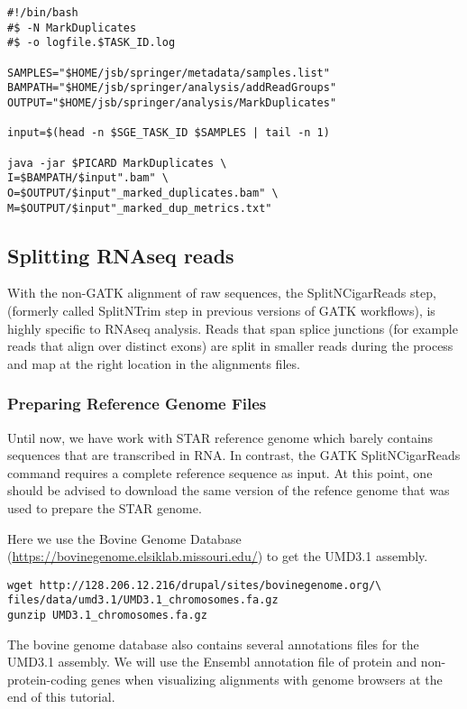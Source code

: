 \begin{verbatim}
#!/bin/bash
#$ -N MarkDuplicates
#$ -o logfile.$TASK_ID.log

SAMPLES="$HOME/jsb/springer/metadata/samples.list"
BAMPATH="$HOME/jsb/springer/analysis/addReadGroups"
OUTPUT="$HOME/jsb/springer/analysis/MarkDuplicates"

input=$(head -n $SGE_TASK_ID $SAMPLES | tail -n 1)

java -jar $PICARD MarkDuplicates \
I=$BAMPATH/$input".bam" \
O=$OUTPUT/$input"_marked_duplicates.bam" \
M=$OUTPUT/$input"_marked_dup_metrics.txt"
\end{verbatim}

\subsection{Splitting RNAseq reads}

With the non-GATK alignment of raw sequences, the SplitNCigarReads step, (formerly called SplitNTrim step in previous versions of GATK workflows), is highly specific to RNAseq analysis. Reads that span splice junctions (for example reads that align over distinct exons) are split in smaller reads during the process and map at the right location in the alignments files.

\subsubsection{Preparing Reference Genome Files}

Until now, we have work with STAR reference genome which barely contains sequences that are transcribed in RNA. In contrast, the GATK SplitNCigarReads command requires a complete reference sequence as input. At this point, one should be advised to download the same version of the refence genome that was used to prepare the STAR genome.

Here we use the Bovine Genome Database (\href{https://bovinegenome.elsiklab.missouri.edu/}{https://bovinegenome.elsiklab.missouri.edu/}) to get the UMD3.1 assembly.

\begin{verbatim}
wget http://128.206.12.216/drupal/sites/bovinegenome.org/\
files/data/umd3.1/UMD3.1_chromosomes.fa.gz
gunzip UMD3.1_chromosomes.fa.gz
\end{verbatim}


The bovine genome database also contains several annotations files for the UMD3.1 assembly. We will use the Ensembl annotation file of protein and non-protein-coding genes when visualizing alignments with genome browsers at the end of this tutorial.

